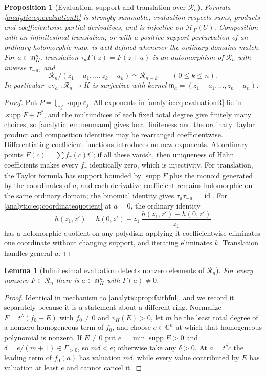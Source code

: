 \documentclass[11pt,letterpaper]{article}
\newtheorem{lemma}[theorem]{Lemma}
\newtheorem{proposition}[theorem]{Proposition}
\theoremstyle{definition}
\theoremstyle{remark}
\newcommand{\C}{\mathbb C}
\newcommand{\RR}{\mathscr R}
\newcommand{\HH}{\mathcal H}
\newcommand{\m}{\mathfrak m}
\newcommand{\supp}{\operatorname{supp}}
\newcommand{\id}{\operatorname{id}}
\newcommand{\ev}{\operatorname{ev}}
\newcommand{\vH}{v_{\!H}}
\numberwithin{equation}{section}
\begin{document}
\begin{proposition}[Evaluation, support and translation over $\RR_n$]
\label{analytic:prop:evaluationR}
Formula \eqref{analytic:eq:evaluationR} is strongly summable; evaluation
respects sums, products and coefficientwise partial derivatives, and is
injective on $\HH_\Gamma(U)$. Composition with an infinitesimal translation,
or with a positive-support perturbation of an ordinary holomorphic map, is
well defined whenever the ordinary domains match. For $a\in\m_K^n$,
translation $\tau_aF(z)=F(z+a)$ is an automorphism of $\RR_n$ with inverse
$\tau_{-a}$, and
\begin{equation}\label{analytic:eq:coordinatequotient}
 \RR_n/(z_1-a_1,\ldots,z_k-a_k)\simeq\RR_{n-k}\qquad(0\le k\le n).
\end{equation}
In particular $\ev_a:\RR_n\to K$ is surjective with kernel
$\m_a=(z_1-a_1,\ldots,z_n-a_n)$.
\end{proposition}
\begin{proof}
Put $P=\bigcup_j\supp\varepsilon_j$. All exponents in
\eqref{analytic:eq:evaluationR} lie in $\supp F+P^*$, and the multiindices
of each fixed total degree give finitely many choices, so
\cref{analytic:lem:neumann} gives local finiteness and the ordinary Taylor
product and composition identities may be rearranged coefficientwise.
Differentiating coefficient functions introduces no new exponents. At
ordinary points $F(c)=\sum f_\gamma(c)t^\gamma$; if all these vanish, then
uniqueness of Hahn coefficients makes every $f_\gamma$ identically zero,
which is injectivity. For translation, the Taylor formula has support
bounded by $\supp F$ plus the monoid generated by the coordinates of $a$,
and each derivative coefficient remains holomorphic on the same ordinary
domain; the binomial identity gives $\tau_a\tau_{-a}=\id$. For
\eqref{analytic:eq:coordinatequotient} at $a=0$, the ordinary identity
\[
 h(z_1,z')=h(0,z')+z_1\,\frac{h(z_1,z')-h(0,z')}{z_1}
\]
has a holomorphic quotient on any polydisk; applying it coefficientwise
eliminates one coordinate without changing support, and iterating
eliminates $k$. Translation handles general $a$.
\end{proof}

\begin{lemma}[Infinitesimal evaluation detects nonzero elements of $\RR_n$]
\label{analytic:lem:density}
For every nonzero $F\in\RR_n$ there is $a\in\m_K^n$ with $F(a)\ne0$.
\end{lemma}
\begin{proof}
Identical in mechanism to \cref{analytic:prop:faithful}, and we record it
separately because it is a statement about a different ring. Normalize
$F=t^\lambda(f_0+E)$ with $f_0\ne0$ and $\vH(E)>0$, let $m$ be the least
total degree of a nonzero homogeneous term of $f_0$, and choose $c\in\C^n$
at which that homogeneous polynomial is nonzero. If $E\ne0$ put
$e=\min\supp E>0$ and $\delta=e/(m+1)\in\Gamma_{>0}$, so $m\delta<e$;
otherwise take any $\delta>0$. At $a=t^\delta c$ the leading term of
$f_0(a)$ has valuation $m\delta$, while every value contributed by $E$ has
valuation at least $e$ and cannot cancel it.
\end{proof}
\end{document}
